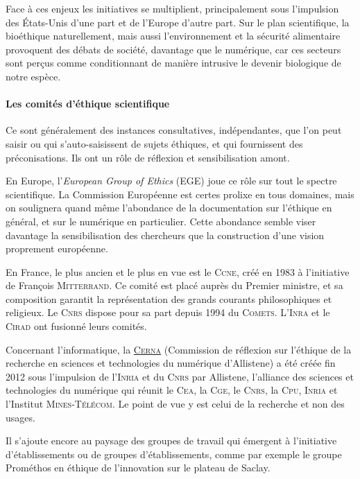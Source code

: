 
Face à ces enjeux les initiatives se multiplient, principalement sous l’impulsion des États-Unis d’une part et de l’Europe d’autre part. Sur le plan scientifique, la bioéthique naturellement, mais aussi l’environnement et la sécurité alimentaire provoquent des débats de société, davantage que le numérique, car ces secteurs sont perçus comme conditionnant de manière intrusive le devenir biologique de notre espèce.

\paragraph*{Les comités d’éthique scientifique}
Ce sont généralement des instances consultatives, indépendantes, que l’on peut saisir ou qui s’auto-saisissent de sujets éthiques, et qui fournissent des préconisations. Ils ont un rôle de réflexion et sensibilisation amont.

En Europe, l’\textit{European Group of Ethics} (EGE) joue ce rôle sur tout le spectre scientifique. La Commission Européenne est certes prolixe en tous domaines, mais on soulignera quand même l’abondance de la documentation sur l’éthique en général, et sur le numérique en particulier. Cette abondance semble viser davantage la sensibilisation des chercheurs que la construction d’une vision proprement européenne.

En France, le plus ancien et le plus en vue est le \textsc{Ccne}, créé en 1983 à l’initiative de François \textsc{Mitterrand}. Ce comité est placé auprès du Premier ministre, et sa composition garantit la représentation des grands courants philosophiques et religieux. Le \textsc{Cnrs} dispose pour sa part depuis 1994 du \textsc{Comets}. L’\textsc{Inra} et le \textsc{Cirad} ont fusionné leurs comités.

Concernant l’informatique, la \href{http://cerna-ethics-allistene.org/}{\textsc{Cerna}} (Commission de réflexion sur l’éthique de la recherche en sciences et technologies du numérique d’Allistene) a été créée fin 2012 sous l’impulsion de l'\textsc{Inria} et du \textsc{Cnrs} par Allistene, l’alliance des sciences et technologies du numérique qui réunit le \textsc{Cea}, la \textsc{Cge}, le \textsc{Cnrs}, la \textsc{Cpu}, \textsc{Inria} et l’Institut \textsc{Mines-Télécom}. Le point de vue y est celui de la recherche et non des usages.

Il s’ajoute encore au paysage des groupes de travail qui émergent à l’initiative d’établissements ou de groupes d’établissements, comme par exemple le groupe Prométhos en éthique de l’innovation sur le plateau de Saclay.

